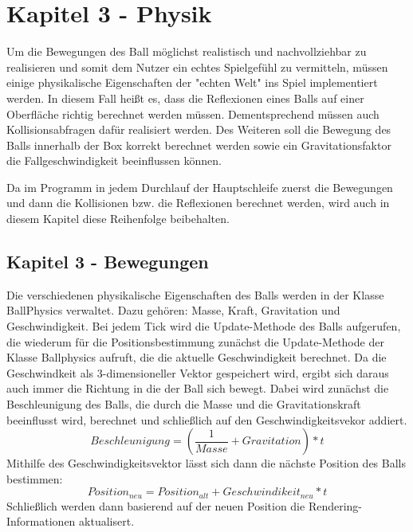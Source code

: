 \chapter{Kapitel 3 - Physik}
\label{Kapitel 4}

Um die Bewegungen des Ball möglichst realistisch und nachvollziehbar zu realisieren und somit dem Nutzer ein echtes Spielgefühl zu vermitteln, müssen einige physikalische Eigenschaften der "{}echten Welt"{} ins Spiel implementiert werden. In diesem Fall heißt es, dass die Reflexionen eines Balls auf einer Oberfläche richtig berechnet werden müssen. Dementsprechend müssen auch Kollisionsabfragen dafür realisiert werden. Des Weiteren soll die Bewegung des Balls innerhalb der Box korrekt berechnet werden sowie ein Gravitationsfaktor die Fallgeschwindigkeit beeinflussen können.

Da im Programm in jedem Durchlauf der Hauptschleife zuerst die Bewegungen und dann die Kollisionen bzw. die Reflexionen berechnet werden, wird auch in diesem Kapitel diese Reihenfolge beibehalten.
\section{Kapitel 3 - Bewegungen}
\label{Kapitel_4_-_Unterkapitel_1}
Die verschiedenen physikalische Eigenschaften des Balls werden in der Klasse BallPhysics verwaltet. Dazu gehören: Masse, Kraft, Gravitation und Geschwindigkeit.
Bei jedem Tick wird die Update-Methode des Balls aufgerufen, die wiederum für die Positionsbestimmung zunächst die Update-Methode der Klasse Ballphysics aufruft, die die aktuelle Geschwindigkeit berechnet. Da die Geschwindkeit als 3-dimensioneller Vektor gespeichert wird, ergibt sich daraus auch immer die Richtung in die der Ball sich bewegt. Dabei wird zunächst die Beschleunigung des Balls, die durch die Masse und die Gravitationskraft beeinflusst wird, berechnet und schließlich auf den Geschwindigkeitsvekor addiert.
 \begin{equation}
	    \label{beschleunigung}
	    Beschleunigung = (\frac{1}{Masse} + Gravitation) * t 
    \end{equation}
Mithilfe des Geschwindigkeitsvektor lässt sich dann die nächste Position des Balls bestimmen:
\begin{equation}
	    \label{beschleunigung}
	    Position_{neu} = Position_{alt} + Geschwindikeit_{neu} * t 
    \end{equation}
Schließlich werden dann basierend auf der neuen Position die Rendering-Informationen aktualisert. 


